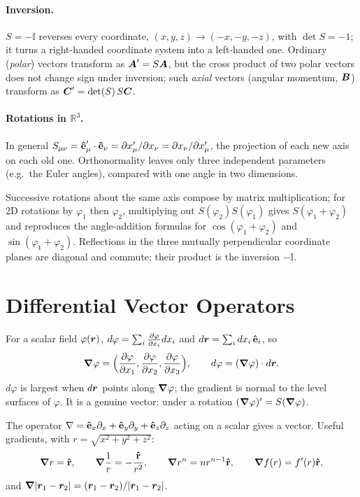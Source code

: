 \paragraph{Inversion.} $S = -\mathbb{I}$ reverses every coordinate, $(x,y,z)\to(-x,-y,-z)$, with $\det S = -1$; it turns a right-handed coordinate system into a left-handed one. Ordinary (\emph{polar}) vectors transform as $\vect{A}' = S\vect{A}$, but the cross product of two polar vectors does not change sign under inversion; such \emph{axial} vectors (angular momentum, $\vect{B}$) transform as $\vect{C}' = \det(S)\,S\vect{C}$.

\paragraph{Rotations in $\mathbb{R}^3$.} In general $S_{\mu\nu} = \boldsymbol{\hat{\textbf{e}}}'_\mu\cdot\boldsymbol{\hat{\textbf{e}}}_\nu = \partial x'_\mu/\partial x_\nu = \partial x_\nu/\partial x'_\mu$, the projection of each new axis on each old one. Orthonormality leaves only three independent parameters (e.g.\ the Euler angles), compared with one angle in two dimensions.

\begin{example}
Successive rotations about the same axis compose by matrix multiplication; for 2D rotations by $\varphi_1$ then $\varphi_2$, multiplying out $S(\varphi_2)S(\varphi_1)$ gives $S(\varphi_1+\varphi_2)$ and reproduces the angle-addition formulas for $\cos(\varphi_1+\varphi_2)$ and $\sin(\varphi_1+\varphi_2)$. Reflections in the three mutually perpendicular coordinate planes are diagonal and commute; their product is the inversion $-\mathbb{I}$.
\end{example}

\section{Differential Vector Operators}

\begin{definition}[Gradient]
For a scalar field $\varphi(\bm{r})$, $d\varphi = \sum_i \pdv{\varphi}{x_i}dx_i$ and $d\bm{r} = \sum_i dx_i\,\boldsymbol{\hat{\textbf{e}}}_i$, so
\[
    \grad\varphi = \Bigl(\pdv{\varphi}{x_1},\pdv{\varphi}{x_2},\pdv{\varphi}{x_3}\Bigr),\qquad d\varphi = (\grad\varphi)\cdot d\bm{r}.
\]
$d\varphi$ is largest when $d\bm{r}$ points along $\grad\varphi$; the gradient is normal to the level surfaces of $\varphi$. It is a genuine vector: under a rotation $(\grad\varphi)' = S(\grad\varphi)$.
\end{definition}
The operator $\nabla = \boldsymbol{\hat{\textbf{e}}}_x\partial_x + \boldsymbol{\hat{\textbf{e}}}_y\partial_y + \boldsymbol{\hat{\textbf{e}}}_z\partial_z$ acting on a scalar gives a vector. Useful gradients, with $r = \sqrt{x^2+y^2+z^2}$:
\[
    \grad r = \boldsymbol{\hat{\textbf{r}}},\qquad \grad\frac1r = -\frac{\boldsymbol{\hat{\textbf{r}}}}{r^2},\qquad \grad r^n = nr^{n-1}\boldsymbol{\hat{\textbf{r}}},\qquad \grad f(r) = f'(r)\boldsymbol{\hat{\textbf{r}}},
\]
and $\grad|\bm{r}_1-\bm{r}_2| = (\bm{r}_1-\bm{r}_2)/|\bm{r}_1-\bm{r}_2|$.

